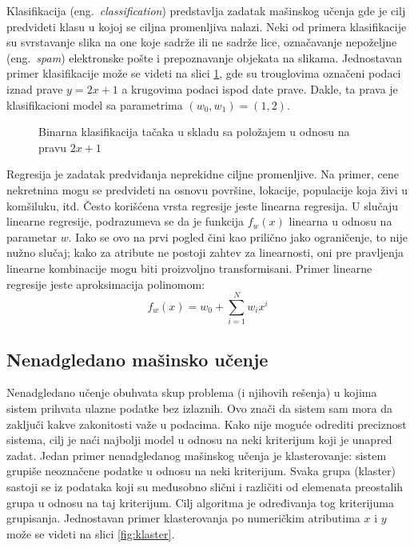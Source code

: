 Klasifikacija (eng.~{\em classification}) predstavlja zadatak mašinskog učenja gde je cilj predvideti klasu u kojoj se ciljna promenljiva nalazi. Neki od primera klasifikacije su svrstavanje slika na one koje sadrže ili ne sadrže lice, označavanje nepoželjne (eng.~{\em spam}) elektronske pošte i prepoznavanje objekata na slikama. 
Jednostavan primer klasifikacije može se videti na slici \ref{fig:bin_klas}, gde su trouglovima označeni podaci iznad prave $y=2x+1$ a krugovima podaci ispod date prave. Dakle, ta prava je klasifikacioni model sa parametrima $(w_0, w_1) = (1, 2)$.

\begin{figure}
	\centering
	\resizebox{.8\linewidth}{!}{}
	\caption{Binarna klasifikacija tačaka u skladu sa položajem u odnosu na pravu $2x+1$}
	\label{fig:bin_klas}
\end{figure}

\par
Regresija je zadatak predviđanja neprekidne ciljne promenljive. Na primer, cene nekretnina mogu se predvideti na osnovu površine, lokacije, populacije koja živi u komšiluku, itd. Često korišćena vrsta regresije jeste linearna regresija. U slučaju linearne regresije, podrazumeva se da je funkcija $f_w(x)$ linearna u odnosu na parametar $w$. Iako se ovo na prvi pogled čini kao prilično jako ograničenje, to nije nužno slučaj; kako za atribute ne postoji zahtev za linearnosti, oni pre pravljenja linearne kombinacije mogu biti proizvoljno transformisani. Primer linearne regresije jeste aproksimacija polinomom:
\begin{equation}
	f_w(x) = w_0 + \sum_{i=1}^{N}w_ix^i
\end{equation}

\subsection{Nenadgledano mašinsko učenje}

Nenadgledano učenje obuhvata skup problema (i njihovih rešenja) u kojima sistem prihvata ulazne podatke bez izlaznih. Ovo znači da sistem sam mora da zaključi kakve zakonitosti važe u podacima.  Kako nije moguće odrediti preciznost sistema, cilj je naći najbolji model u odnosu na neki kriterijum koji je unapred zadat.
Jedan primer nenadgledanog mašinskog učenja je klasterovanje: sistem grupiše neoznačene podatke u odnosu na  neki kriterijum. Svaka grupa (klaster) sastoji se iz podataka koji su međusobno slični i različiti od elemenata preostalih grupa u odnosu na taj kriterijum. Cilj algoritma je određivanja tog kriterijuma grupisanja. Jednostavan primer klasterovanja po numeričkim atributima $x$ i $y$ može se videti na slici \ref{fig:klaster}.
	
